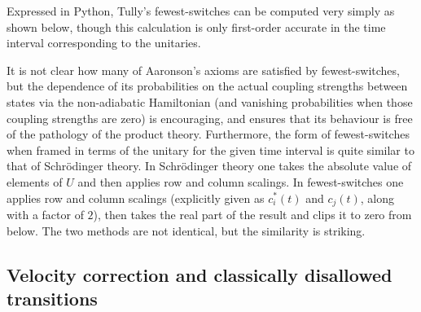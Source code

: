 Expressed in Python, Tully's fewest-switches can be computed very simply as shown below, though this calculation is only first-order accurate in the time interval corresponding to the unitaries.


It is not clear how many of Aaronson's axioms are satisfied by fewest-switches, but the dependence of its probabilities on the actual coupling strengths between states via the non-adiabatic Hamiltonian (and vanishing probabilities when those coupling strengths are zero) is encouraging, and ensures that its behaviour is free of the pathology of the product theory. Furthermore, the form of fewest-switches when framed in terms of the unitary for the given time interval is quite similar to that of Schr\"odinger theory. In Schr\"odinger theory one takes the absolute value of elements of $U$ and then applies row and column scalings. In fewest-switches one applies row and column scalings (explicitly given as $c_i^*(t)$ and $c_j(t)$, along with a factor of $2$), then takes the real part of the result and clips it to zero from below. The two methods are not identical, but the similarity is striking.

\subsection{Velocity correction and classically disallowed transitions}\label{sec:velocity_correction}

